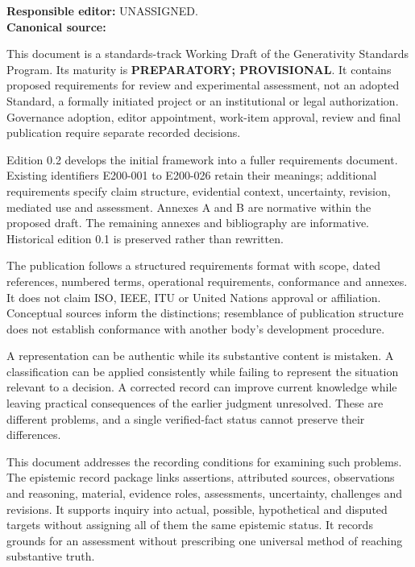 \documentclass[11pt,a4paper]{article}
\begin{document}
\GSPfrontmatter
{}
\noindent\textbf{Responsible editor:} UNASSIGNED.\\
\textbf{Canonical source:} 

This document is a standards-track Working Draft of the Generativity Standards Program. Its maturity is \textbf{PREPARATORY; PROVISIONAL}. It contains proposed requirements for review and experimental assessment, not an adopted Standard, a formally initiated project or an institutional or legal authorization. Governance adoption, editor appointment, work-item approval, review and final publication require separate recorded decisions.

Edition 0.2 develops the initial framework into a fuller requirements document. Existing identifiers E200-001 to E200-026 retain their meanings; additional requirements specify claim structure, evidential context, uncertainty, revision, mediated use and assessment. Annexes A and B are normative within the proposed draft. The remaining annexes and bibliography are informative. Historical edition 0.1 is preserved rather than rewritten.

The publication follows a structured requirements format with scope, dated references, numbered terms, operational requirements, conformance and annexes. It does not claim ISO, IEEE, ITU or United Nations approval or affiliation. Conceptual sources inform the distinctions; resemblance of publication structure does not establish conformance with another body's development procedure.

\tableofcontents\clearpage
{}
A representation can be authentic while its substantive content is mistaken. A classification can be applied consistently while failing to represent the situation relevant to a decision. A corrected record can improve current knowledge while leaving practical consequences of the earlier judgment unresolved. These are different problems, and a single verified-fact status cannot preserve their differences.

This document addresses the recording conditions for examining such problems. The epistemic record package links assertions, attributed sources, observations and reasoning, material, evidence roles, assessments, uncertainty, challenges and revisions. It supports inquiry into actual, possible, hypothetical and disputed targets without assigning all of them the same epistemic status. It records grounds for an assessment without prescribing one universal method of reaching substantive truth.
\end{document}
